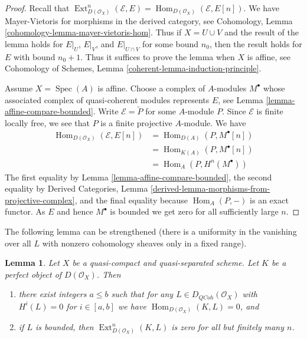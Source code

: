 \documentclass{stacks-project}
\theoremstyle{plain}
\newtheorem{lemma}[subsection]{Lemma}
\theoremstyle{definition}
\theoremstyle{remark}
\numberwithin{equation}{subsection}
\def\Spec{\mathop{\mathrm{Spec}}}
\def\Hom{\mathop{\mathrm{Hom}}\nolimits}
\def\Ext{\mathop{\mathrm{Ext}}\nolimits}
\def\QCoh{\mathit{QCoh}}
\begin{document}
\begin{proof}
Recall that $\Ext^n_{D(\mathcal{O}_X)}(\mathcal{E}, E) =
\Hom_{D(\mathcal{O}_X)}(\mathcal{E}, E[n])$. We have
Mayer-Vietoris for morphisms in the derived category, see
Cohomology, Lemma \ref{cohomology-lemma-mayer-vietoris-hom}.
Thus if $X = U \cup V$ and the result of the lemma holds
for $E|_U$, $E|_V$, and $E|_{U \cap V}$ for some bound $n_0$,
then the result holds for $E$ with bound $n_0 + 1$.
Thus it suffices to prove the lemma when $X$ is affine, see
Cohomology of Schemes, Lemma \ref{coherent-lemma-induction-principle}.

\medskip\noindent
Assume $X = \Spec(A)$ is affine. Choose a complex of $A$-modules
$M^\bullet$ whose associated complex of quasi-coherent modules
represents $E$, see Lemma \ref{lemma-affine-compare-bounded}.
Write $\mathcal{E} = \widetilde{P}$ for some $A$-module $P$.
Since $\mathcal{E}$ is finite locally free, we see that $P$
is a finite projective $A$-module. We have
\begin{align*}
\Hom_{D(\mathcal{O}_X)}(\mathcal{E}, E[n])
& = 
\Hom_{D(A)}(P, M^\bullet[n]) \\
& =
\Hom_{K(A)}(P, M^\bullet[n]) \\
& =
\Hom_A(P, H^n(M^\bullet))
\end{align*}
The first equality by Lemma \ref{lemma-affine-compare-bounded},
the second equality by
Derived Categories, Lemma
\ref{derived-lemma-morphisms-from-projective-complex}, and
the final equality because $\Hom_A(P, -)$ is an exact functor.
As $E$ and hence $M^\bullet$ is bounded
we get zero for all sufficiently large $n$.
\end{proof}

\noindent
The following lemma can be strengthened (there is a uniformity
in the vanishing over all $L$ with nonzero cohomology sheaves
only in a fixed range).

\begin{lemma}
\label{lemma-ext-from-perfect-into-bounded-QCoh}
Let $X$ be a quasi-compact and quasi-separated scheme.
Let $K$ be a perfect object of $D(\mathcal{O}_X)$. Then
\begin{enumerate}
\item there exist integers $a \leq b$ such that for any
$L \in D_\QCoh(\mathcal{O}_X)$ with $H^i(L) = 0$ for $i \in [a, b]$
we have $\Hom_{D(\mathcal{O}_X)}(K, L) = 0$, and
\item if $L$ is bounded, then $\Ext^n_{D(\mathcal{O}_X)}(K, L)$
is zero for all but finitely many $n$.
\end{enumerate}
\end{lemma}
\end{document}
